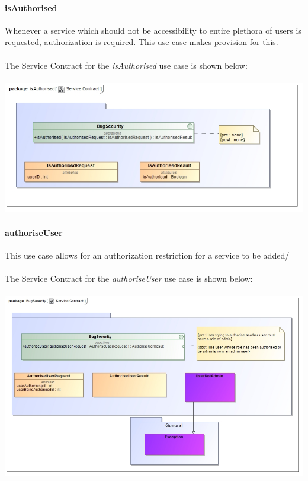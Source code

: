 \documentclass[11pt,a4paper,titlepage]{article}
\begin{document}
		\paragraph{isAuthorised }
		Whenever a service which should not be accessibility to entire plethora of users is requested, authorization is required. This use case makes provision for this.\\\hfill\\
		The Service Contract for the \textit{isAuthorised} use case is shown below:\\\hfill\\
		\includegraphics[width=\linewidth]{isAuthorised}
		\paragraph{authoriseUser }
		This use case allows for an authorization restriction for a service to be added/\\\hfill\\
		The Service Contract for the \textit{authoriseUser} use case is shown below:\\\hfill\\
		\includegraphics[width=\linewidth]{authorise}
\end{document}
